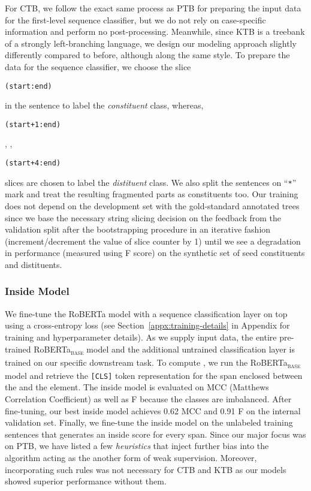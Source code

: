 \documentclass[11pt]{article}
\newcommand{\ptb}{\textsc{PTB}}
\newcommand{\ctb}{\textsc{CTB}}
\newcommand{\ktb}{\textsc{KTB}}
\newcommand{\roberta}{RoBERTa}
\begin{document}
For \ctb{}, we follow the exact same process as \ptb{} for preparing the input data for the first-level sequence classifier, but we do not rely on case-specific information and perform no post-processing. Meanwhile, since \ktb{} is a treebank of a strongly left-branching language, we design our modeling approach slightly differently compared to before, although along the same style. To prepare the data for the sequence classifier, we choose the slice \begin{small}\texttt{(start:end)}\end{small} in the sentence to label the \emph{constituent} class, whereas, \begin{small}{\texttt{(start+1:end)}}\end{small}, , \begin{small}{\texttt{(start+4:end)}}\end{small} slices are chosen to label the \emph{distituent} class. We also split the sentences on ``\texttt{*}'' mark and treat the resulting fragmented parts as constituents too. Our training does not depend on the development set with the gold-standard annotated trees since we base the necessary string slicing decision on the feedback from the validation split after the bootstrapping procedure in an iterative fashion (increment/decrement the value of slice counter by 1) until we see a degradation in performance (measured using F score) on the synthetic set of seed constituents and distituents.



\subsubsection{Inside Model}
\label{ssec:inside-model-prepare}

We fine-tune the \roberta{} model with a sequence classification layer on top using a cross-entropy loss (see Section~\ref{appx:training-details} in Appendix for training and hyperparameter details). As we supply input data, the entire pre-trained \roberta{}\textsubscript{\textsc{base}} model and the additional untrained classification layer is trained on our specific downstream task. To compute , we run the \roberta{}\textsubscript{\textsc{base}} model and retrieve the \texttt{[CLS]} token representation for the span enclosed between the  and the  element. The inside model is evaluated on MCC (Matthews Correlation Coefficient) as well as F because the classes are imbalanced. After fine-tuning, our best inside model achieves 0.62 MCC and 0.91 F on the internal validation set. Finally, we fine-tune the inside model on the unlabeled training sentences that generates an inside score  for every span. Since our major focus was on \ptb{}, we have listed a few \emph{heuristics} that inject further bias into the algorithm acting as the another form of weak supervision. Moreover, incorporating such rules was not necessary for \ctb{} and \ktb{} as our models showed superior performance without them.
\end{document}
